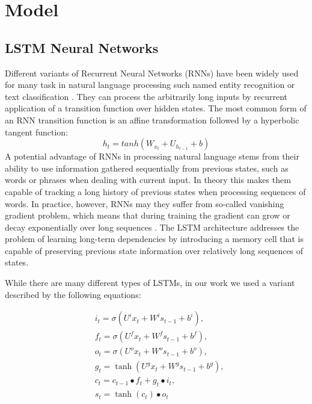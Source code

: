 \documentclass[10pt, a4paper]{article}
\begin{document}
\section{Model} 


\subsection{LSTM Neural Networks}

Different variants of Recurrent Neural Networks (RNNs) have been widely used for many task in natural language processing such named entity recognition \cite{lample2016neural} or text classification \cite{lai2015recurrent}. They can process the arbitrarily long inputs by recurrent application of a transition function over hidden states. The most common form of an RNN transition function is an affine transformation followed by a hyperbolic tangent function:
	\begin{equation} h_t = tanh(W_{x_t}+U_{h_{t-1}}+b)
\end{equation}
	A potential advantage of RNNs in processing natural language stems from their ability to use information gathered sequentially from previous states, such as words or phrases when dealing with current input. In theory this makes them capable of tracking a long history of previous states when processing sequences of words. In practice, however, RNNs may they suffer from so-called vanishing gradient problem, which means that during training the gradient can grow or decay exponentially over long sequences \cite{bengio1994learning,hochreiter1998vanishing}. The LSTM architecture \cite{hochreiter1997long} addresses the problem of learning long-term dependencies by introducing a memory cell that is capable of preserving previous state information over relatively long sequences of states.
\par While there are many different types of LSTMs, in our work we used a variant described by the following equations:
		
\begin{equation}
\begin{split}
		&i_t = \sigma(U^i{x_t} + W^is_{t-1} + b^i) ,\\
		&f_t = \sigma(U^f{x_t} + W^fs_{t-1} + b^f) ,\\
		&o_t = \sigma(U^o{x_t} + W^os_{t-1} + b^o) ,\\
		&g_t = \tanh(U^g{x_t}+ W^gs_{t-1} + b^g) ,\\
		&c_t = c_{t-1} \bullet f_t + g_t \bullet i_t ,\\
		&s_t = \tanh(c_t) \bullet o_t 
\end{split}
\end{equation}
\end{document}
